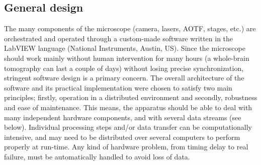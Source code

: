 \documentclass[12pt]{spieman}  %
\begin{document}
\subsection{General design}
The many components of the microscope (camera, lasers, AOTF, stages, etc.) are orchestrated and operated through a custom-made software written in the LabVIEW language (National Instruments, Austin, US). Since the microscope should work mainly without human intervention for many hours (a whole-brain tomography can last a couple of days) without losing precise synchronization, stringent software design is a primary concern. The overall architecture of the software and its practical implementation were chosen to satisfy two main principles; firstly, operation in a distributed environment and secondly, robustness and ease of maintenance. This means, the apparatus should be able to deal with many independent hardware components, and with several data streams (see below). Individual processing steps and/or data transfer can be computationally intensive, and may need to be distributed over several computers to perform properly at run-time. Any kind of hardware problem, from timing delay to real failure, must be automatically handled to avoid loss of data.

\end{document}
